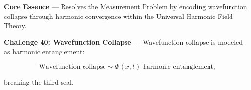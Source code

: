 
\textbf{Core Essence} --- Resolves the Measurement Problem by encoding wavefunction collapse through harmonic convergence within the Universal Harmonic Field Theory.

\textbf{Challenge 40: Wavefunction Collapse} --- Wavefunction collapse is modeled as harmonic entanglement:

$$
\text{Wavefunction collapse} \sim \Phi(x, t) \text{ harmonic entanglement,}
$$

breaking the third seal.

